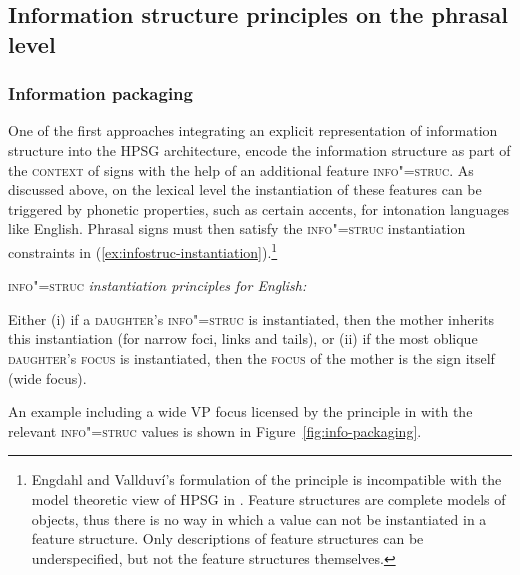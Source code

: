 \documentclass[output=paper]{langsci/langscibook}
\begin{document}
\subsection{Information structure principles on the phrasal level}
\label{sec:infostruc-phrase}

\subsubsection{Information packaging \citep{EV96a}}

One of the first approaches integrating an explicit representation of
information structure into the HPSG architecture, \cite{EV96a} encode
the information structure as part of the  \textsc{context} of signs
with the help of an additional feature \textsc{info"=struc}. As
discussed above, on the lexical level the instantiation of these
features can be triggered by phonetic properties, such as certain
accents, for intonation languages like English. Phrasal signs must
then satisfy the \textsc{info"=struc} instantiation constraints in
(\ref{ex:infostruc-instantiation}).\footnote{Engdahl and Vallduví’s formulation of
the principle is incompatible with the model theoretic view of HPSG in \cite{ps2}.
Feature structures are complete models of objects, thus there is no way
in which a value can not be instantiated in a feature structure. Only descriptions
of feature structures can be underspecified, but not the feature
structures themselves.}
\begin{exe}
  \ex\label{ex:infostruc-instantiation} \textsc{info"=struc} \textit{instantiation principles for English:}
  \begin{xlist}
    \exi{} Either (i) if a \textsc{daughter}'s \textsc{info"=struc} is instantiated, then the mother inherits this instantiation (for narrow foci, links and tails),
    \exi{} or (ii) if the most oblique \textsc{daughter}'s \textsc{focus} is instantiated, then the \textsc{focus} of the mother is the sign itself (wide focus).
  \end{xlist}
\end{exe}

An example including a wide VP focus licensed by the principle in  with
the relevant \textsc{info"=struc} values is shown in
Figure~\ref{fig:info-packaging}.
\end{document}
